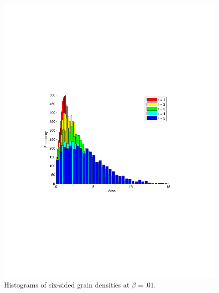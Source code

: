 \begin{figure}
\includegraphics[width=\textwidth]{histbetazerotier6.pdf}
\vspace{-130pt}
\caption{Histograms of six-sided grain densities at $\beta = .01.$}
\end{figure}

